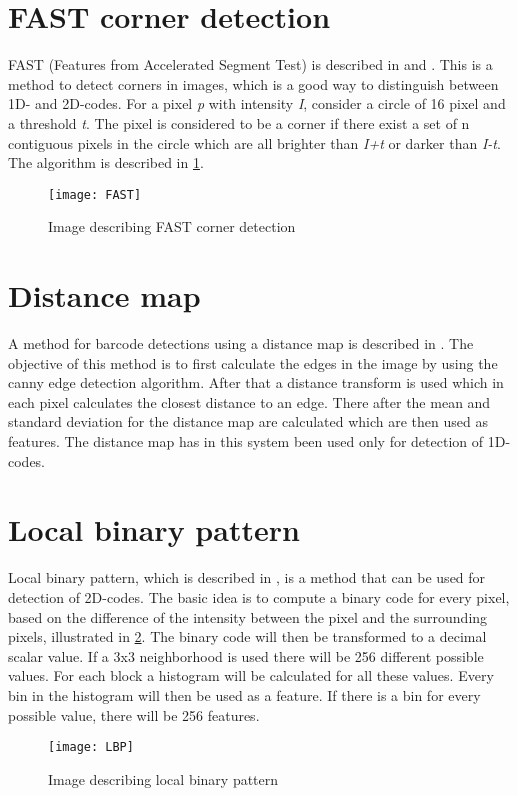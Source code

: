 \section{FAST corner detection}
\label{sec:FAST corner detection}
FAST (Features from Accelerated Segment Test) is described in \citep{Rosten:2006} and \citep{Rosten:2005}. This is a method to detect corners in images, which is a good way to distinguish between 1D- and 2D-codes. For a pixel \textit{p} with intensity \textit{I}, consider a circle of 16 pixel and a threshold \textit{t}. The pixel is considered to be a corner if there exist a set of n contiguous pixels in the circle which are all brighter than \textit{I+t} or darker than \textit{I-t}. The algorithm is described in \ref{FAST}.

\begin{figure}[H]
\centering
	\texttt{[image: FAST]}
	\caption{Image describing FAST corner detection}
	\label{FAST}
\end{figure}

\section{Distance map}
\label{sec:Distance map}
A method for barcode detections using a distance map is described in \citep{Bodnar}. The objective of this method is to first calculate the edges in the image by using the canny edge detection algorithm. After that a distance transform is used which in each pixel calculates the closest distance to an edge. There after the mean and standard deviation for the distance map are calculated which are then used as features. The distance map has in this system been used only for detection of 1D-codes.
 
\section{Local binary pattern}
\label{sec:Local binary pattern}
Local binary pattern, which is described in \citep{Pietikainen:2010}, is a method that can be used for detection of 2D-codes. The basic idea is to compute a binary code for every pixel, based on the difference of the intensity between the pixel and the surrounding pixels, illustrated in \ref{LBP}. The binary code will then be transformed to a decimal scalar value. If a 3x3 neighborhood is used there will be 256 different possible values. For each block a histogram will be calculated for all these values. Every bin in the histogram will then be used as a feature. If there is a bin for every possible value, there will be 256 features.

\begin{figure}[H]
\centering
	\texttt{[image: LBP]}
	\caption{Image describing local binary pattern}
	\label{LBP}
\end{figure}

